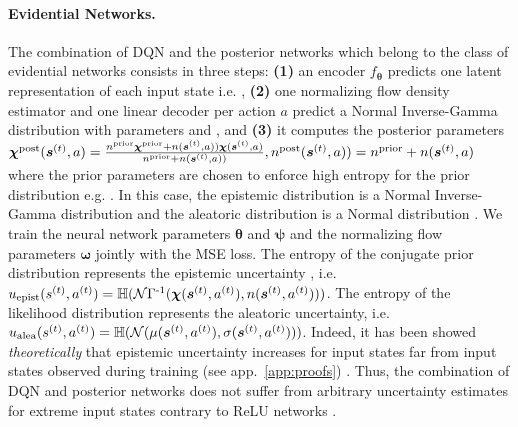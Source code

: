 \paragraph{Evidential Networks.} The combination of DQN and the posterior networks \cite{natpn, postnet}  which belong to the class of evidential networks consists in three steps: \textbf{(1)} an encoder $ f_{\bm{\theta}}$ predicts one latent representation of each input state i.e. , \textbf{(2)} one normalizing flow density estimator  and one linear decoder  per action $a$ predict a Normal Inverse-Gamma distribution  with parameters  and , and \textbf{(3)} it computes the posterior parameters $\bm{\chi}^\text{post}(\bm{s}^{(t)}, a) = \frac{n^\text{prior}\bm{\chi}^\text{prior} + n(\bm{s}^{(t)}, a)) \bm{\chi}(\bm{s}^{(t)}, a)}{n^\text{prior} + n(\bm{s}^{(t)}, a))}, n^\text{post}(\bm{s}^{(t)}, a)) = n^\text{prior} + n(\bm{s}^{(t)}, a)$ where the prior parameters are chosen to enforce high entropy for the prior distribution e.g.  \cite{natpn}. In this case, the epistemic distribution is a Normal Inverse-Gamma distribution and the aleatoric distribution is a Normal distribution \cite{natpn}. We train the neural network parameters $\bm{\theta}$ and $\bm{\psi}$ and the normalizing flow parameters $\bm{\omega}$ jointly with the MSE loss. The entropy of the conjugate prior distribution represents the epistemic uncertainty , i.e. $u_\text{epist}(s^{(t)}, a^{(t)}) = \operatorname{\mathbb{H}}(\operatorname{\mathcal{N}\Gamma^{-1}}(\bm{\chi}(\bm{s}^{(t)}, a^{(t)}), n(\bm{s}^{(t)}, a^{(t)})))$. The entropy of the likelihood distribution represents the aleatoric uncertainty, i.e. $u_\text{alea}(s^{(t)}, a^{(t)}) = \operatorname{\mathbb{H}}(\operatorname{\mathcal{N}}(\mu(\bm{s}^{(t)}, a^{(t)}), \sigma(\bm{s}^{(t)}, a^{(t)})))$. Indeed, it has been showed \emph{theoretically} that epistemic uncertainty increases for input states far from input states observed during training (see app.~\ref{app:proofs}) \cite{natpn}. Thus, the combination of DQN and posterior networks does not suffer from arbitrary uncertainty estimates for extreme input states contrary to ReLU networks \cite{overconfident-relu}.
